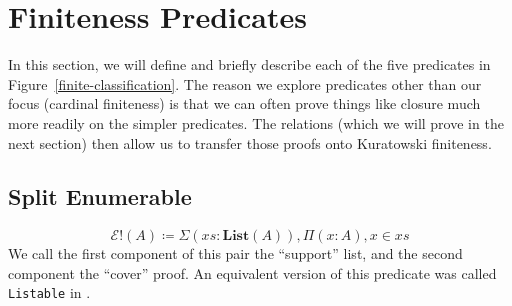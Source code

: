 \section{Finiteness Predicates}
In this section, we will define and briefly describe each of the five predicates
in Figure~\ref{finite-classification}.
The reason we explore predicates other than our focus (cardinal finiteness) is
that we can often prove things like closure much more readily on the simpler
predicates.
The relations (which we will prove in the next section) then allow us to
transfer those proofs onto Kuratowski finiteness.
\subsection{Split Enumerable}
\begin{romdefinition} \label{split-enum-def}
  \begin{equation} \label{split-enum-def-eqn}
    \mathcal{E}!(A) \coloneqq \Sigma {(\mathit{xs} : \textbf{List}(A))} , \Pi {(x : A)} , x \in \mathit{xs}
  \end{equation}
  We call the first component of this pair the ``support'' list, and the second
  component the ``cover'' proof.
  An equivalent version of this predicate was called \verb+Listable+ in
  \cite{firsovDependentlyTypedProgramming2015}.
\end{romdefinition}

